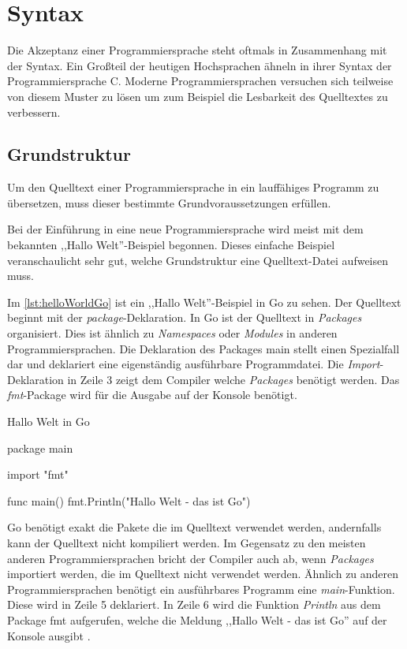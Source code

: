 \chapter{Syntax}
Die Akzeptanz einer Programmiersprache steht oftmals in Zusammenhang mit der Syntax. 
Ein Großteil der heutigen Hochsprachen ähneln in ihrer Syntax der Programmiersprache C. 
Moderne Programmiersprachen versuchen sich teilweise von diesem Muster zu lösen um zum Beispiel die Lesbarkeit des Quelltextes zu verbessern.

\section{Grundstruktur}
Um den Quelltext einer Programmiersprache in ein lauffähiges Programm zu übersetzen, muss dieser bestimmte Grundvoraussetzungen erfüllen.

Bei der Einführung in eine neue Programmiersprache wird meist mit dem bekannten ,,Hallo Welt''-Beispiel begonnen.
Dieses einfache Beispiel veranschaulicht sehr gut, welche Grundstruktur eine Quelltext-Datei aufweisen muss.

Im \autoref{lst:helloWorldGo} ist ein ,,Hallo Welt''-Beispiel in Go zu sehen.
Der Quelltext beginnt mit der \emph{package}-Deklaration.
In Go ist der Quelltext in \emph{Packages} organisiert. 
Dies ist ähnlich zu \emph{Namespaces} oder \emph{Modules} in anderen Programmiersprachen.
Die Deklaration des Packages main stellt einen Spezialfall dar und deklariert eine eigenständig ausführbare Programmdatei.
Die \emph{Import}-Deklaration in Zeile 3 zeigt dem Compiler welche \emph{Packages} benötigt werden.
Das \emph{fmt}-Package wird für die Ausgabe auf der Konsole benötigt.

\begin{listing}[H]
\caption{Hallo Welt in Go}
\label{lst:helloWorldGo}
\begin{GoCode}
package main

import "fmt"

func main() {
    fmt.Println("Hallo Welt - das ist Go")
}
\end{GoCode}
\end{listing}

Go benötigt exakt die Pakete die im Quelltext verwendet werden, andernfalls kann der Quelltext nicht kompiliert werden. 
Im Gegensatz zu den meisten anderen Programmiersprachen bricht der Compiler auch ab, wenn \emph{Packages} importiert werden, die im Quelltext nicht verwendet werden.
Ähnlich zu anderen Programmiersprachen benötigt ein ausführbares Programm eine \emph{main}-Funktion.
Diese wird in Zeile 5 deklariert.
In Zeile 6 wird die Funktion \emph{Println} aus dem Package fmt aufgerufen, welche die Meldung ,,Hallo Welt - das ist Go'' auf der Konsole ausgibt \cite{Donovan.2016}.


